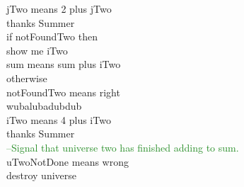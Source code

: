 \documentclass[numbers]{sigplanconf}
\begin{document}
{\indent \indent \indent \noindent jTwo means 2 plus jTwo \\

\indent \indent \noindent thanks Summer \\

\indent \indent \noindent if notFoundTwo then \\
\indent \indent \indent show me iTwo \\
\indent \indent \indent sum means sum plus iTwo \\
\indent \indent otherwise \\
\indent \indent \indent notFoundTwo means right \\
\indent \indent wubalubadubdub \\

\indent \indent \noindent iTwo means 4 plus iTwo \\
 
\indent \noindent thanks Summer \\

\textcolor{ForestGreen}{  --Signal that universe two has finished adding to sum.} \\
\indent uTwoNotDone means wrong \\

\noindent destroy universe \\
}
\end{document}
